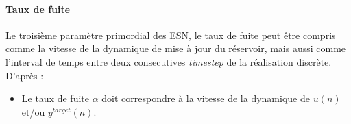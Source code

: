 \documentclass[12pt]{article}
\begin{document}
\paragraph{Taux de fuite}
Le troisième paramètre primordial des ESN, le taux de fuite peut être compris comme la vitesse de la dynamique de mise à jour du réservoir, mais aussi comme l'interval de temps entre deux consecutives \textit{timestep} de la réalisation discrète.\newline
D'après \cite{Lukosevicius12}:
\begin{itemize}
\item Le taux de fuite $\alpha$ doit correspondre à la vitesse de la dynamique de $u(n)$ et/ou $y^{target}(n)$.
\end{itemize}




\end{document}
